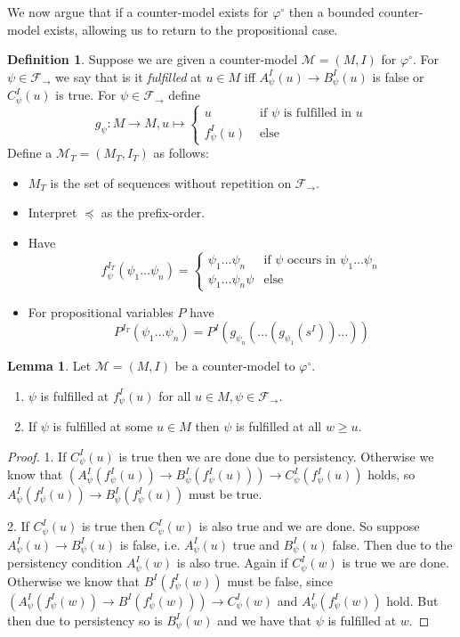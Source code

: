 \documentclass[a4paper,12pt]{report}
\theoremstyle{definition}
\theoremstyle{definition}
\theoremstyle{definition}
\newtheorem{lemma}[theorem]{Lemma}
\theoremstyle{definition}
\theoremstyle{definition}
\newtheorem{definition}[theorem]{Definition}
\theoremstyle{definition}
\theoremstyle{definition}
\begin{document}
	We now argue that if a counter-model exists for $\varphi^\circ$ then a bounded counter-model exists, allowing us to return to the propositional case.
	
	\begin{definition}
		Suppose we are given a counter-model $\mathcal M = (M, I)$ for $\varphi^\circ$. For $\psi\in\mathcal F_\to$ we say that is it \textit{fulfilled} at $u\in M$ iff $A_\psi^I(u)\to B_\psi^I(u)$ is false or $C_\psi^I(u)$ is true. For $\psi\in\mathcal F_\to$ define $$g_\psi : M\to M, u\mapsto\begin{cases}
			u&\text{ if $\psi$ is fulfilled in $u$}\\
			f^I_\psi(u)&\text{ else}		
		\end{cases}$$Define a $\mathcal M_T = (M_T, I_T)$ as follows:
		\begin{itemize}
			\item $M_T$ is the set of sequences without repetition on $\mathcal F_\to$.
			\item Interpret $\preceq$ as the prefix-order.
			\item Have $$f_\psi^{I_T}(\psi_1\dots\psi_n) = \begin{cases}
				\psi_1\dots\psi_n&\text{if $\psi$ occurs in $\psi_1\dots\psi_n$}\\
				\psi_1\dots\psi_n\psi&\text{else}			
			\end{cases}$$
			\item For propositional variables $P$ have $$P^{I_T}(\psi_1\dots \psi_n) = P^I(g_{\psi_n}(\dots(g_{\psi_1}(s^I))\dots))$$
		\end{itemize}
	\end{definition}
	\begin{lemma}
		Let $\mathcal M = (M, I)$ be a counter-model to $\mathcal \varphi^\circ$.
		\begin{enumerate}
			\item $\psi$ is fulfilled at $f_\psi^I(u)$ for all $u\in M, \psi\in\mathcal F_\to$.
			\item If $\psi$ is fulfilled at some $u\in M$ then $\psi$ is fulfilled at all $w\geq u$.
		\end{enumerate}
		
	\end{lemma}
	
	\begin{proof}
		1. If $C_\psi^I(u)$ is true then we are done due to persistency. Otherwise we know that $(A_\psi^I(f_\psi^I(u))\to B_\psi^I(f_\psi^I(u)))\to C_\psi^I(f_\psi^I(u))$ holds, so $A_\psi^I(f_\psi^I(u))\to B_\psi^I(f_\psi^I(u))$ must be true.
		
		2. If $C_\psi^I(u)$ is true then $C_\psi^I(w)$ is also true and we are done. So suppose $A_\psi^I(u)\to B_\psi^I(u)$ is false, i.e. $A_\psi^I(u)$ true and $B_\psi^I(u)$ false. Then due to the persistency condition $A_\psi^I(w)$ is also true. Again if $C_\psi^I(w)$ is true we are done. Otherwise we know that $B^I(f^I_\psi(w))$ must be false, since $(A^I_\psi(f^I_\psi(w))\to B^I(f^I_\psi(w)))\to C^I_\psi(w)$ and $A^I_\psi(f^I_\psi(w))$ hold. But then due to persistency so is $B^I_\psi(w)$ and we have that $\psi$ is fulfilled at $w$.
	\end{proof}
	
\end{document}
